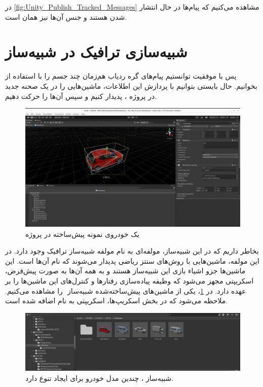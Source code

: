 در \cref{fig:Unity_Publish_Tracked_Messages} مشاهده می‌کنیم که پیام‌ها در حال انتشار شدن هستند و جنس آن‌ها نیز همان  است.

\section{شبیه‌سازی ترافیک در شبیه‌ساز}
پس با موفقیت توانستیم پیام‌های گره ردیاب هم‌زمان چند جسم را با استفاده از  بخوانیم. حال بایستی بتوانیم با پردازش این اطلاعات، ماشین‌هایی را در یک صحنه جدید در پروژه ، پدیدار کنیم و سپس آن‌ها را حرکت دهیم.

\begin{figure}[h!]
    \centering
    \includegraphics[width=1\linewidth]{figures/NPCVehicle_Prefab.png}
    \caption{یک خودروی نمونه پیش‌ساخته در پروژه }
    \label{fig:NPCVehicle_Prefab}
\end{figure}

بخاطر داریم که در این شبیه‌ساز، مولفه‌ای به نام مولفه شبیه‌ساز ترافیک وجود دارد. در این مولفه، ماشین‌هایی با روش‌های سنتز ریاضی پدیدار می‌شوند که نام آن‌ها  است. این ماشین‌ها جزو اشیاء بازی این شبیه‌ساز هستند و به همه آن‌ها به صورت پیش‌فرض، اسکریپتی مجهز می‌شود که وظیفه پیاده‌سازی رفتارها و کنترل‌های این ماشین‌ها را  بر عهده دارد. در \cref{fig:NPCVehicle_Prefab}، یکی از ماشین‌های پیش‌ساخته‌شده شبیه‌ساز ‌ را مشاهده می‌کنیم. ملاحظه می‌شود که در بخش اسکریپ‌ها، اسکریپتی به نام  اضافه شده است.
\begin{figure}[h!]
    \centering
    \includegraphics[width=1\linewidth]{figures/NPCVehicle_Prefabs.png}
    \caption{شبیه‌ساز ‌، چندین مدل خودرو برای ایجاد تنوع دارد.}
    \label{fig:NPCVehicle_Prefabs}
\end{figure}

